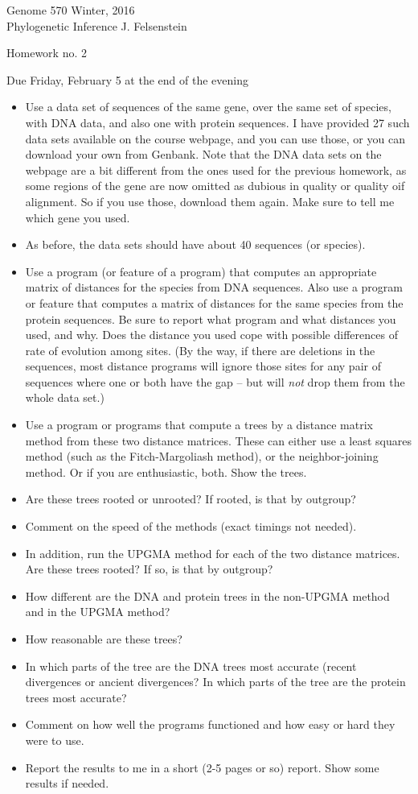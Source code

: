 \documentclass[12pt]{article}
\begin{document}
{\large
\noindent
Genome 570 \hfill Winter, 2016\\
Phylogenetic Inference \hfill J. Felsenstein\\
}

\centerline{Homework no. 2}

\centerline{Due Friday, February 5 at the end of the evening}
\bigskip

\begin{itemize}
\item Use a data set of sequences of the same gene, over the same set of
species, with DNA data, and also one with protein sequences.  I have provided
27 such data sets available on the course webpage, and you can use those, or
you can download your own from Genbank.  Note that the DNA data sets on the
webpage are a bit different from the ones used for the previous homework, as
some regions of the gene are now omitted as dubious in quality or quality oif
alignment.  So if you use those, download them again.  Make sure to tell me
which gene you used.
\item As before,
the data sets should have about 40 sequences (or species).
\item Use a program (or feature of a program) that computes an appropriate
matrix of distances for the species from DNA sequences. Also use a program or feature that
computes a matrix of distances for the same species from the protein sequences.
Be sure to report what program and what distances you used, and why.
Does the distance you used
cope with possible differences of rate of 
evolution among sites.  (By the way, if there are deletions in the sequences, most distance
programs will ignore those sites for any pair of sequences where one or both
have the gap -- but will {\it not} drop them from the whole data set.)
\item Use a program or programs that compute a trees by a distance matrix method
from these two distance matrices.  These can either use a least squares method
(such as the Fitch-Margoliash method), or the neighbor-joining method.  Or if
you are enthusiastic, both.  Show the trees.
\item Are these trees rooted or unrooted?  If rooted, is that by outgroup?
\item Comment on the speed of the methods (exact timings not needed).
\item In addition, run the UPGMA method for each of the two distance matrices.
Are these trees rooted?  If so, is that by outgroup?
\item How different are the DNA and protein trees in the non-UPGMA method and
in the UPGMA method?
\item How reasonable are these trees?
\item In which parts of the tree are the DNA trees most accurate (recent
divergences or ancient divergences?  In which parts of the tree are the protein
trees most accurate?
\item Comment on how well the programs functioned and how easy or hard they were to use.
\item Report the results to me in a short (2-5 pages or so) report.  Show some
results if needed.
\end{itemize}
\bigskip
\end{document}
